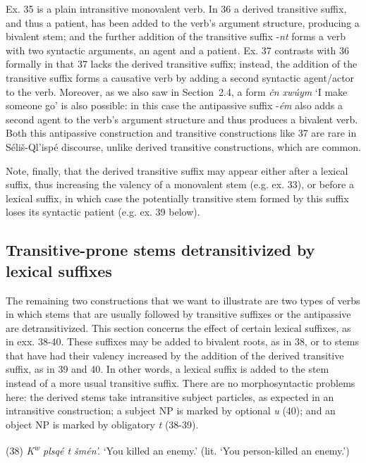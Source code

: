 \documentclass[output=paper,colorlinks,citecolor=brown]{langscibook}
\begin{document}
\bigskip

Ex. 35 is a plain intransitive monovalent verb. In 36 a derived
transitive suffix, and thus a patient, has been added to the verb's
argument structure, producing a bivalent stem; and the further
addition of the transitive suffix -\emph{nt} forms a verb with two
syntactic arguments, an agent and a patient.  Ex. 37 contrasts with 36
formally in that 37 lacks the derived transitive suffix; instead, the
addition of the transitive suffix forms a causative verb by adding a
second syntactic agent/actor to the verb.  Moreover, as we also saw in
Section~2.4, a form \emph{\v{c}n xw\'uym} `I make someone go' is also
possible: in this case the antipassive suffix -\emph{\'em} also adds a
second agent to the verb's argument structure and thus produces a
bivalent verb.  Both this antipassive construction and transitive
constructions like 37 are rare in S\'eli\v{s}-Ql'isp\'e discourse,
unlike derived transitive constructions, which are common.

Note, finally, that the derived transitive suffix may appear either
after a lexical suffix, thus increasing the valency of a monovalent
stem (e.g. ex. 33), or before a lexical suffix, in which case the
potentially transitive stem formed by this suffix loses its syntactic
patient (e.g. ex. 39 below).

\subsection{Transitive-prone stems detransitivized by lexical suffixes}  %

The remaining two constructions that we want to illustrate are two
types of verbs in which stems that are usually followed by transitive
suffixes or the antipassive are detransitivized.  This section
concerns the effect of certain lexical suffixes, as in exx. 38-40.
These suffixes may be added to bivalent roots, as in 38, or to stems
that have had their valency increased by the addition of the derived
transitive suffix, as in 39 and 40.  In other words, a lexical suffix
is added to the stem instead of a more usual transitive suffix.  There
are no morphosyntactic problems here: the derived stems take
intransitive subject particles, as expected in an intransitive
construction; a subject NP is marked by optional \emph{{\textltilde}u}
(40); and an object NP is marked by obligatory \emph{t} (38-39).

\clearpage

(38) \emph{{K\textsuperscript w} plsq\'e t \v{s}m\'en'.} `You killed an
enemy.' (lit. `You person-killed an enemy.')
\end{document}
